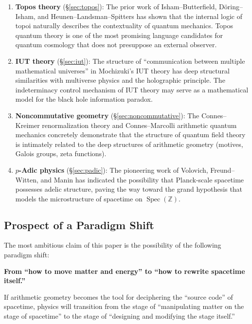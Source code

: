 \documentclass[12pt,a4paper]{article}
\theoremstyle{definition}
\newcommand{\Spec}{\operatorname{Spec}}
\begin{document}
\begin{enumerate}[leftmargin=2em]
  \item \textbf{Topos theory} (\S\ref{sec:topos}): The prior work of Isham--Butterfield, D\"{o}ring--Isham, and Heunen--Landsman--Spitters has shown that the internal logic of topoi naturally describes the contextuality of quantum mechanics. Topos quantum theory is one of the most promising language candidates for quantum cosmology that does not presuppose an external observer.

  \item \textbf{IUT theory} (\S\ref{sec:iut}): The structure of ``communication between multiple mathematical universes'' in Mochizuki's IUT theory has deep structural similarities with multiverse physics and the holographic principle. The indeterminacy control mechanism of IUT theory may serve as a mathematical model for the black hole information paradox.

  \item \textbf{Noncommutative geometry} (\S\ref{sec:noncommutative}): The Connes--Kreimer renormalization theory and Connes--Marcolli arithmetic quantum mechanics concretely demonstrate that the structure of quantum field theory is intimately related to the deep structures of arithmetic geometry (motives, Galois groups, zeta functions).

  \item \textbf{$p$-Adic physics} (\S\ref{sec:padic}): The pioneering work of Volovich, Freund--Witten, and Manin has indicated the possibility that Planck-scale spacetime possesses adelic structure, paving the way toward the grand hypothesis that models the microstructure of spacetime on $\Spec(\mathbb{Z})$.
\end{enumerate}

\subsection{Prospect of a Paradigm Shift}

The most ambitious claim of this paper is the possibility of the following paradigm shift:

\begin{keyinsight}
\textbf{From ``how to move matter and energy'' to ``how to rewrite spacetime itself.''}

If arithmetic geometry becomes the tool for deciphering the ``source code'' of spacetime, physics will transition from the stage of ``manipulating matter on the stage of spacetime'' to the stage of ``designing and modifying the stage itself.''
\end{keyinsight}
\end{document}
